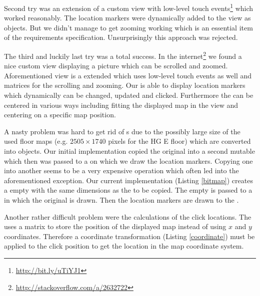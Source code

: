 Second try was an extension of a custom view with low-level touch events\footnote{\url{http://bit.ly/uTiYJ1}} which worked reasonably. The location markers were dynamically added to the view as  objects. But we didn't manage to get zooming working which is an essential item of the requirements specification. Unsurprisingly this approach was rejected.

The third and luckily last try was a total success. In the internet\footnote{\url{http://stackoverflow.com/a/2632722}} we found a nice custom view displaying a picture which can be scrolled and zoomed. Aforementioned view is a extended  which uses low-level touch events as well and matrices for the scrolling and zooming. Our  is able to display location markers which dynamically can be changed, updated and clicked. Furthermore the  can be centered in various ways including fitting the displayed map in the view and centering on a specific map position.

A nasty problem was hard to get rid of s due to the possibly large size of the used floor maps (e.g. $2505 \times 1740$ pixels for the HG E floor) which are converted into  objects. Our initial implementation copied the original  into a second mutable  which then was passed to a  on which we draw the location markers. Copying one  into another seems to be a very expensive operation which often led into the aforementioned exception. Our current implementation (Listing \ref{bitmap}) creates a empty  with the same dimensions as the  to be copied. The empty  is passed to a  in which the original  is drawn. Then the location markers are drawn to the .



Another rather difficult problem were the calculations of the click locations. The  uses a matrix to store the position of the displayed map instead of using $x$ and $y$ coordinates. Therefore a coordinate transformation (Listing \ref{coordinate}) must be applied to the click position to get the location in the map coordinate system.


